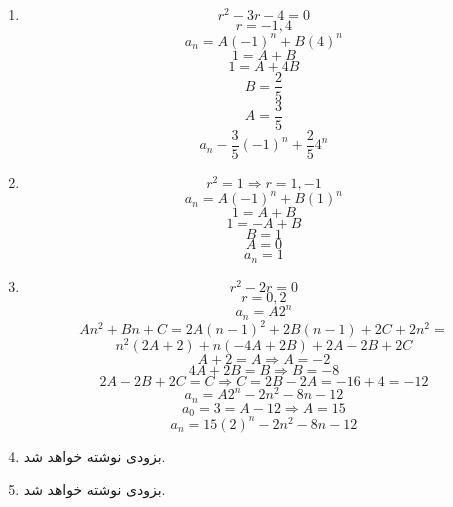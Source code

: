 \p
\begin{enumerate}
\item
$$r^2 - 3r - 4 = 0$$
$$r = -1, 4$$
$$a_n = A(-1)^n + B(4)^n$$
$$1 = A + B$$
$$1 = A + 4B$$
$$B = \frac{2}{5}$$
$$A = \frac{3}{5}$$
$$a_n - \frac{3}{5}(-1)^n + \frac{2}{5}4^n$$
\item
$$r^2 = 1 \Rightarrow r = 1, -1$$
$$a_n = A(-1)^n + B(1)^n$$
$$1 = A + B$$
$$1 = -A + B$$
$$B = 1$$
$$A = 0$$
$$a_n = 1$$
\item
$$r^2 - 2r = 0$$
$$r = 0, 2$$
$$a_n = A2^n$$
$$An^2 + Bn + C = 2A(n-1)^2 + 2B(n-1) + 2C + 2n^2 =$$
$$ n^2(2A + 2) + n(-4A+2B) + 2A - 2B + 2C$$
$$A + 2 = A \Rightarrow A = -2$$
$$4A + 2B = B \Rightarrow B = -8$$
$$2A - 2B + 2C = C \Rightarrow C = 2B - 2A = -16 + 4 = -12$$
$$a_n = A2^n - 2n^2 - 8n - 12$$
$$a_0 = 3 = A - 12 \Rightarrow A = 15$$
$$a_n = 15(2)^n - 2n^2 - 8n - 12$$
\item
بزودی نوشته خواهد شد.
\item
بزودی نوشته خواهد شد.
\end{enumerate}

